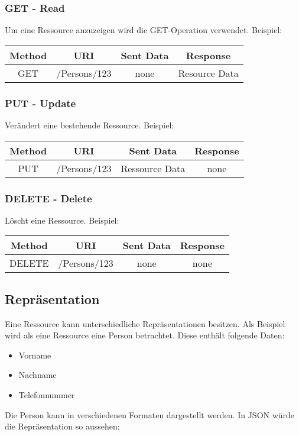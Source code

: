 \documentclass[listof=totoc]{article}
\begin{document}
	\subsubsection{GET - Read}
	Um eine Ressource anzuzeigen wird die GET-Operation verwendet. 
	\newline \newline
	Beispiel:
	\begin{tabular}{|c|c|c|c|}
		\hline 
		Method & URI & Sent Data & Response \\ 
		\hline 
		GET & /Persons/123 & none & Resource Data \\ 
		\hline 
	\end{tabular} 
	\subsubsection{PUT - Update}
	Verändert eine bestehende Ressource.
	\newline \newline
	Beispiel:
	\begin{tabular}{|c|c|c|c|}
		\hline 
		Method & URI & Sent Data & Response \\ 
		\hline 
		PUT & /Persons/123 & Ressource Data & none \\ 
		\hline 
	\end{tabular} 
	\subsubsection{DELETE - Delete}
	Löscht eine Ressource.
	\newline \newline
	Beispiel:
	\begin{tabular}{|c|c|c|c|}
		\hline 
		Method & URI & Sent Data & Response \\ 
		\hline 
		DELETE & /Persons/123 & none & none \\ 
		\hline 
	\end{tabular} 
	\subsection{Repräsentation}\label{subsec:Repraesentation}
	Eine Ressource kann unterschiedliche Repräsentationen besitzen.
	Als Beispiel wird als eine Ressource eine Person betrachtet. Diese enthält folgende Daten:
	\begin{itemize} 
		\setlength{\itemsep}{0pt} 
		\item Vorname
		\item Nachname
		\item Telefonnummer
	\end{itemize}
	Die Person kann in verschiedenen Formaten dargestellt werden. 
	In \ac{JSON} würde die Repräsentation so aussehen:
	
\end{document}
